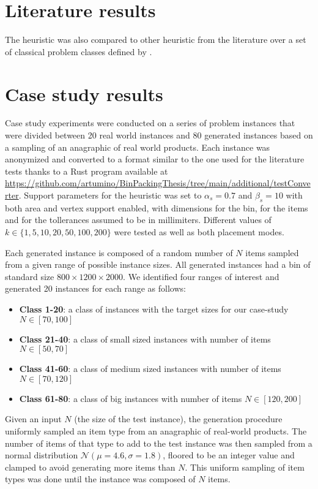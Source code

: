 \section{Literature results}
The heuristic was also compared to other heuristic from the literature over a set of classical problem classes defined by \citeauthor{martello2000three}. %
\label{exp:literature_tests}
\label{def:class1_instances}

\section{Case study results}
Case study experiments were conducted on a series of problem instances that were divided between 20 real world instances and 80 generated instances based on a sampling of an anagraphic of real world products.
Each instance was anonymized and converted to a format similar to the one used for the literature tests thanks to a Rust program available at \url{https://github.com/artumino/BinPackingThesis/tree/main/additional/testConverter}.
Support parameters for the heuristic was set to $\alpha_s = 0.7$ and $\beta_s = 10$ with both area and vertex support enabled, with dimensions for the bin, for the items and for the tollerances assumed to be in millimiters.
Different values of $k \in \{1, 5, 10, 20, 50, 100, 200\}$ were tested as well as both placement modes.

Each generated instance is composed of a random number of $N$ items sampled from a given range of possible instance sizes. All generated instances had a bin of standard size $800 \times 1200 \times 2000$.
We identified four ranges of interest and generated 20 instances for each range as follows:
\begin{itemize}
    \item \textbf{Class 1-20}: a class of instances with the target sizes for our case-study $N \in [70,100]$
    \item \textbf{Class 21-40}: a class of small sized instances with number of items $N \in [50,70]$
    \item \textbf{Class 41-60}: a class of medium sized instances with number of items $N \in [70,120]$
    \item \textbf{Class 61-80}: a class of big instances with number of items $N \in [120,200]$
\end{itemize}

Given an input $N$ (the size of the test instance), the generation procedure uniformly sampled an item type from an anagraphic of real-world products. The number of items of that type to add to the test instance was then sampled from a normal distribution $\mathcal{N}(\mu = 4.6, \sigma = 1.8)$, floored to be an integer value and clamped to avoid generating more items than $N$. 
This uniform sampling of item types was done until the instance was composed of $N$ items.

